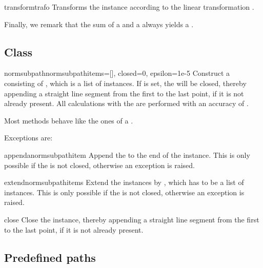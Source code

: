 \begin{methoddesc}{transform}{trafo}
  Transforms the  instance according to the linear
  transformation . 
\end{methoddesc}

Finally, we remark that the sum of a  and a 
always yields a . 


\subsection{Class }

\begin{classdesc}{normsubpath}{normsubpathitems=[], closed=0,
    epsilon=1e-5}
  Construct a  consisting of
  , which is a list of 
  instances. If  is set, the  will be
  closed, thereby appending a straight line segment from the first to
  the last point, if it is not already present. All calculations with
  the  are performed with an accuracy of . 
\end{classdesc}

Most  methods behave like the ones of a
. 

Exceptions are:

\begin{methoddesc}{append}{anormsubpathitem}
  Append the  to the end of the
   instance. This is only possible if the
   is not closed, otherwise an exception is raised. 
\end{methoddesc}

\begin{methoddesc}{extend}{normsubpathitems}
  Extend the  instances by ,
  which has to be a list of  instances. This is
  only possible if the  is not closed, otherwise an
  exception is raised. 
\end{methoddesc}

\begin{methoddesc}{close}{}
  Close the  instance, thereby appending a straight
  line segment from the first to the last point, if it is not already
  present. 
\end{methoddesc}

\subsection{Predefined paths}

